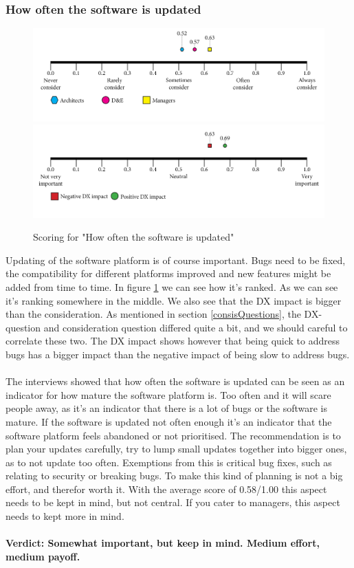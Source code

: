 \documentclass{article}
\begin{document}
\subsubsection{How often the software is updated}
\begin{figure}[H]
\centering
\includegraphics[width=\linewidth]{scorelines/aspect1.png}
\includegraphics[width=\linewidth]{dxscorelines/dxaspect1.png}
\caption{Scoring for "How often the software is updated"}
\label{fig:aspect1}
\end{figure}
Updating of the software platform is of course important. Bugs need to be fixed, the compatibility for different platforms improved and new features might be added from time to time. In figure \ref{fig:aspect1} we can see how it's ranked. As we can see it's ranking somewhere in the middle. We also see that the DX impact is bigger than the consideration. As mentioned in section \ref{consisQuestions}, the DX-question and consideration question differed quite a bit, and we should careful to correlate these two. The DX impact shows however that being quick to address bugs has a bigger impact than the negative impact of being slow to address bugs.\\ \\The interviews showed that how often the software is updated can be seen as an indicator for how mature the software platform is. Too often and it will scare people away, as it's an indicator that there is a lot of bugs or the software is mature. If the software is updated not often enough it's an indicator that the software platform feels abandoned or not prioritised. The recommendation is to plan your updates carefully, try to lump small updates together into bigger ones, as to not update too often. Exemptions from this is critical bug fixes, such as relating to security or breaking bugs. To make this kind of planning is not a big effort, and therefor worth it. With the average score of 0.58/1.00 this aspect needs to be kept in mind, but not central. If you cater to managers, this aspect needs to kept more in mind. \\ \\
\textbf{Verdict: Somewhat important, but keep in mind. Medium effort, medium payoff.}
\end{document}
